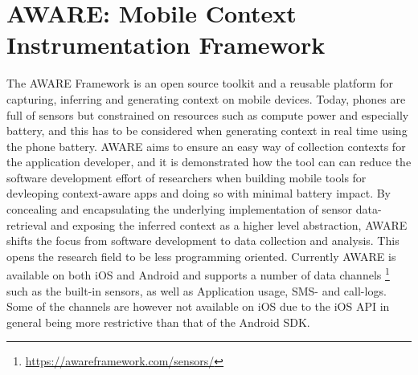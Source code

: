 \section{AWARE: Mobile Context Instrumentation Framework}
The AWARE Framework \cite{aware2015} is an open source toolkit and a reusable platform for capturing, inferring and generating context on mobile devices. Today, phones are full of sensors but constrained on resources such as compute power and especially battery, and this has to be considered when generating  context in real time using the phone battery. AWARE aims to ensure an easy way of collection contexts for the application developer, and it is demonstrated how the tool can can reduce the software development effort of researchers when building mobile tools for devleoping context-aware apps and doing so with minimal battery impact. By concealing and encapsulating the underlying implementation of sensor data-retrieval and exposing the inferred context as a higher level abstraction, AWARE shifts the focus from software development to data collection and analysis. This opens the research field to be less programming oriented. Currently AWARE is available on both iOS and Android and supports a number of data channels \footnote{\url{https://awareframework.com/sensors/}} such as the built-in sensors, as well as Application usage, SMS- and call-logs. Some of the channels are however not available on iOS due to the iOS API in general being more restrictive than that of the Android SDK.